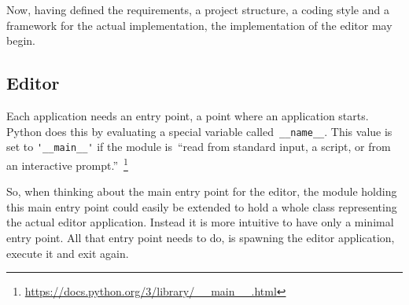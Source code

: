\documentclass[
    a4paper,      %
    10pt,         %
    openright,    %
    notitlepage,  %
    parskip=half, %
]{scrreprt}       %
\theoremstyle{definition}                    %
\begin{document}
Now, having defined the requirements, a project structure, a coding style and a
framework for the actual implementation, the implementation of the editor may
begin.


\subsection{Editor}
\label{subsec:editor}

Each application needs an entry point, a point where an application starts.
Python does this by evaluating a special variable called~\verb+__name__+. This
value is set to \verb+'__main__'+ if the module is~\enquote{read from standard
input, a script, or from an interactive
prompt.}~\footnote{\url{https://docs.python.org/3/library/__main__.html}}

So, when thinking about the main entry point for the editor, the module holding
this main entry point could easily be extended to hold a whole class
representing the actual editor application. Instead it is more intuitive to have
only a minimal entry point. All that entry point needs to do, is spawning the
editor application, execute it and exit again.
\end{document}
